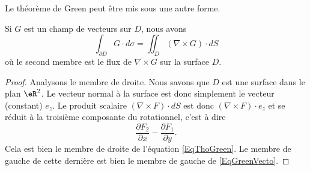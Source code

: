 Le théorème de Green peut être mis sous une autre forme.

\begin{theorem}       \label{ThoGreenVecto}
    Si $G$ est un champ de vecteurs sur $D$, nous avons
    \begin{equation}        \label{EqGreenVecto}
        \int_{\partial D}G\cdot d\sigma=\iint_D(\nabla\times G)\cdot dS
    \end{equation}
    où le second membre est le flux de $\nabla\times G$ sur la surface $D$.
\end{theorem}

\begin{proof}
    Analysons le membre de droite. Nous savons que $D$ est une surface dans le plan $\eR^2$. Le vecteur normal à la surface est donc simplement le vecteur (constant) $e_z$. Le produit scalaire $(\nabla\times F)\cdot dS$ est donc $(\nabla\times F)\cdot e_z$ et se réduit à la troisième composante du rotationnel, c'est à dire
    \begin{equation}
        \frac{ \partial F_2 }{ \partial x }-\frac{ \partial F_1 }{ \partial y }.
    \end{equation}
    Cela est bien le membre de droite de l'équation \eqref{EqThoGreen}. Le membre de gauche de cette dernière est bien le membre de gauche de \eqref{EqGreenVecto}.
\end{proof}

